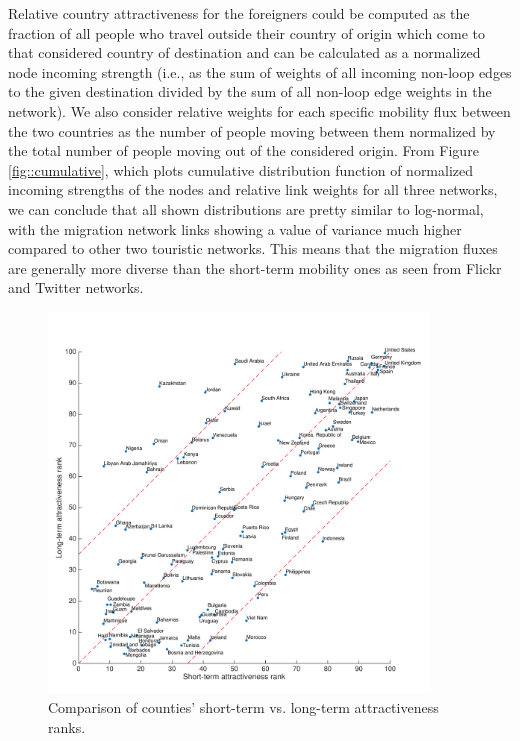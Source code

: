 \documentclass[aps,superscriptaddress,showkeys,nofootinbib]{revtex4-1}
\begin{document}
Relative country attractiveness for the foreigners could be computed as the fraction of all people who travel outside their country of origin which come to that considered country of destination and can be calculated as a normalized node incoming strength (i.e., as the sum of weights of all incoming non-loop edges to the given destination divided by the sum of all non-loop edge weights in the network). We also consider relative weights for each specific mobility flux between the two countries as the number of people moving between them normalized by the total number of people moving out of the considered origin. From Figure\,\ref{fig::cumulative}, which plots cumulative distribution function of normalized incoming strengths of the nodes and relative link weights for all three networks, we can conclude that all shown distributions are pretty similar to log-normal, with the migration network links showing a value of variance much higher compared to other two touristic networks. This means that the migration fluxes are generally more diverse than the short-term mobility ones as seen from Flickr and Twitter networks.

\begin{figure}[b]
\centering
\includegraphics[width=0.9\textwidth]{ranks_migration_vs_flickr+twitter-eps-converted-to.pdf}
\caption{\label{fig::ranks}Comparison of counties' short-term vs. long-term attractiveness ranks.}
\end{figure}
\end{document}
